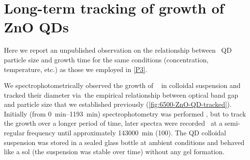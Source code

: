 \documentclass[webedition,openright,titles,swedish,english]{LuaUUThesis}\usepackage[]{graphicx}\usepackage[]{xcolor}
\newcommand{\etc}{etc.}
\newcommand{\via}{via}
\begin{document}
%

\section{Long-term tracking of growth of ZnO QDs}
\label{results:P21-tracking-growth-ZnO-QDs}

Here we report an unpublished observation on the relationship between
\ZnO\ \gls{QD} particle size and growth time for the same conditions (concentration,
temperature, \etc) as those we employed in \cref{P3}.

We spectrophotometrically observed the growth of \ZnO\  in
colloidal suspension and tracked their diameter \via\ the
empirical relationship between optical band gap and particle size that
we established previously (\cref{fig:6500-ZnO-QD-tracked}).
Initially (from \qtyrange{0}{1193}{\minute}) spectrophotometry was performed \insitu,
but to track the growth over a longer period of time,
later spectra were recorded \exsitu\
at a semi-regular frequency until approximately \qty{143000}{\minute} (\qty{100}{\days}).
The \gls{QD} colloidal suspension was stored in a sealed glass bottle at ambient conditions
and behaved like a sol (the suspension was stable over time) without any gel formation.


%
\end{document}
